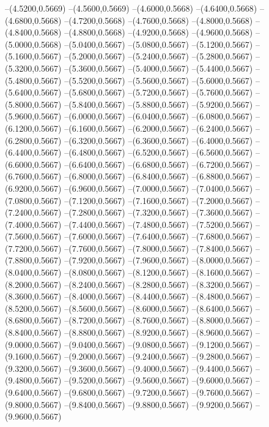 {	--(4.5200,0.5669)
	--(4.5600,0.5669)
	--(4.6000,0.5668)
	--(4.6400,0.5668)
	--(4.6800,0.5668)
	--(4.7200,0.5668)
	--(4.7600,0.5668)
	--(4.8000,0.5668)
	--(4.8400,0.5668)
	--(4.8800,0.5668)
	--(4.9200,0.5668)
	--(4.9600,0.5668)
	--(5.0000,0.5668)
	--(5.0400,0.5667)
	--(5.0800,0.5667)
	--(5.1200,0.5667)
	--(5.1600,0.5667)
	--(5.2000,0.5667)
	--(5.2400,0.5667)
	--(5.2800,0.5667)
	--(5.3200,0.5667)
	--(5.3600,0.5667)
	--(5.4000,0.5667)
	--(5.4400,0.5667)
	--(5.4800,0.5667)
	--(5.5200,0.5667)
	--(5.5600,0.5667)
	--(5.6000,0.5667)
	--(5.6400,0.5667)
	--(5.6800,0.5667)
	--(5.7200,0.5667)
	--(5.7600,0.5667)
	--(5.8000,0.5667)
	--(5.8400,0.5667)
	--(5.8800,0.5667)
	--(5.9200,0.5667)
	--(5.9600,0.5667)
	--(6.0000,0.5667)
	--(6.0400,0.5667)
	--(6.0800,0.5667)
	--(6.1200,0.5667)
	--(6.1600,0.5667)
	--(6.2000,0.5667)
	--(6.2400,0.5667)
	--(6.2800,0.5667)
	--(6.3200,0.5667)
	--(6.3600,0.5667)
	--(6.4000,0.5667)
	--(6.4400,0.5667)
	--(6.4800,0.5667)
	--(6.5200,0.5667)
	--(6.5600,0.5667)
	--(6.6000,0.5667)
	--(6.6400,0.5667)
	--(6.6800,0.5667)
	--(6.7200,0.5667)
	--(6.7600,0.5667)
	--(6.8000,0.5667)
	--(6.8400,0.5667)
	--(6.8800,0.5667)
	--(6.9200,0.5667)
	--(6.9600,0.5667)
	--(7.0000,0.5667)
	--(7.0400,0.5667)
	--(7.0800,0.5667)
	--(7.1200,0.5667)
	--(7.1600,0.5667)
	--(7.2000,0.5667)
	--(7.2400,0.5667)
	--(7.2800,0.5667)
	--(7.3200,0.5667)
	--(7.3600,0.5667)
	--(7.4000,0.5667)
	--(7.4400,0.5667)
	--(7.4800,0.5667)
	--(7.5200,0.5667)
	--(7.5600,0.5667)
	--(7.6000,0.5667)
	--(7.6400,0.5667)
	--(7.6800,0.5667)
	--(7.7200,0.5667)
	--(7.7600,0.5667)
	--(7.8000,0.5667)
	--(7.8400,0.5667)
	--(7.8800,0.5667)
	--(7.9200,0.5667)
	--(7.9600,0.5667)
	--(8.0000,0.5667)
	--(8.0400,0.5667)
	--(8.0800,0.5667)
	--(8.1200,0.5667)
	--(8.1600,0.5667)
	--(8.2000,0.5667)
	--(8.2400,0.5667)
	--(8.2800,0.5667)
	--(8.3200,0.5667)
	--(8.3600,0.5667)
	--(8.4000,0.5667)
	--(8.4400,0.5667)
	--(8.4800,0.5667)
	--(8.5200,0.5667)
	--(8.5600,0.5667)
	--(8.6000,0.5667)
	--(8.6400,0.5667)
	--(8.6800,0.5667)
	--(8.7200,0.5667)
	--(8.7600,0.5667)
	--(8.8000,0.5667)
	--(8.8400,0.5667)
	--(8.8800,0.5667)
	--(8.9200,0.5667)
	--(8.9600,0.5667)
	--(9.0000,0.5667)
	--(9.0400,0.5667)
	--(9.0800,0.5667)
	--(9.1200,0.5667)
	--(9.1600,0.5667)
	--(9.2000,0.5667)
	--(9.2400,0.5667)
	--(9.2800,0.5667)
	--(9.3200,0.5667)
	--(9.3600,0.5667)
	--(9.4000,0.5667)
	--(9.4400,0.5667)
	--(9.4800,0.5667)
	--(9.5200,0.5667)
	--(9.5600,0.5667)
	--(9.6000,0.5667)
	--(9.6400,0.5667)
	--(9.6800,0.5667)
	--(9.7200,0.5667)
	--(9.7600,0.5667)
	--(9.8000,0.5667)
	--(9.8400,0.5667)
	--(9.8800,0.5667)
	--(9.9200,0.5667)
	--(9.9600,0.5667)
}
